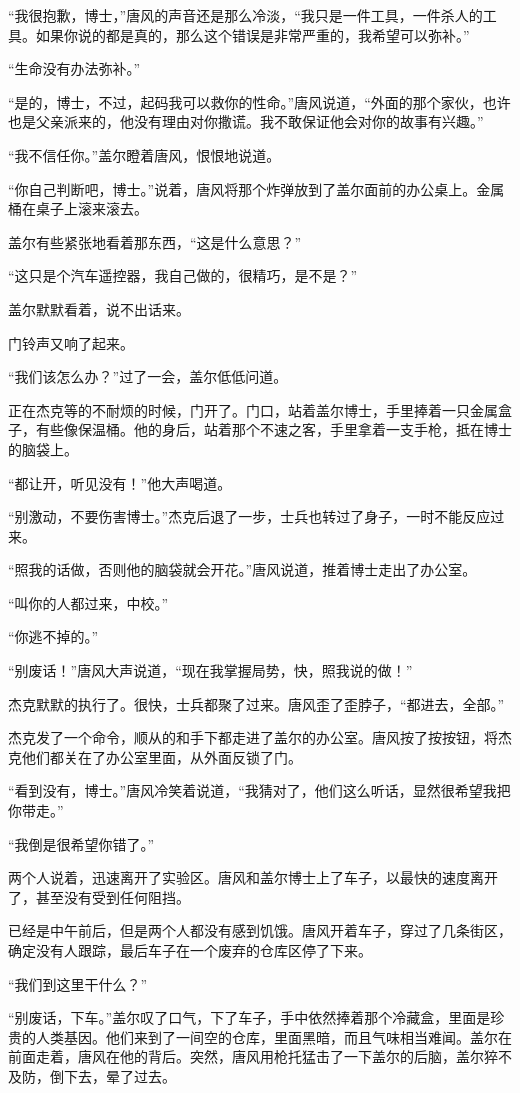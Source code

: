 “我很抱歉，博士，”唐风的声音还是那么冷淡，“我只是一件工具，一件杀人的工具。如果你说的都是真的，那么这个错误是非常严重的，我希望可以弥补。”

“生命没有办法弥补。”

“是的，博士，不过，起码我可以救你的性命。”唐风说道，“外面的那个家伙，也许也是父亲派来的，他没有理由对你撒谎。我不敢保证他会对你的故事有兴趣。”

“我不信任你。”盖尔瞪着唐风，恨恨地说道。

“你自己判断吧，博士。”说着，唐风将那个炸弹放到了盖尔面前的办公桌上。金属桶在桌子上滚来滚去。

盖尔有些紧张地看着那东西，“这是什么意思？”

“这只是个汽车遥控器，我自己做的，很精巧，是不是？”

盖尔默默看着，说不出话来。

门铃声又响了起来。

“我们该怎么办？”过了一会，盖尔低低问道。

正在杰克等的不耐烦的时候，门开了。门口，站着盖尔博士，手里捧着一只金属盒子，有些像保温桶。他的身后，站着那个不速之客，手里拿着一支手枪，抵在博士的脑袋上。

“都让开，听见没有！”他大声喝道。

“别激动，不要伤害博士。”杰克后退了一步，士兵也转过了身子，一时不能反应过来。

“照我的话做，否则他的脑袋就会开花。”唐风说道，推着博士走出了办公室。

“叫你的人都过来，中校。”

“你逃不掉的。”

“别废话！”唐风大声说道，“现在我掌握局势，快，照我说的做！”

杰克默默的执行了。很快，士兵都聚了过来。唐风歪了歪脖子，“都进去，全部。”

杰克发了一个命令，顺从的和手下都走进了盖尔的办公室。唐风按了按按钮，将杰克他们都关在了办公室里面，从外面反锁了门。

“看到没有，博士。”唐风冷笑着说道，“我猜对了，他们这么听话，显然很希望我把你带走。”

“我倒是很希望你错了。”

两个人说着，迅速离开了实验区。唐风和盖尔博士上了车子，以最快的速度离开了，甚至没有受到任何阻挡。

已经是中午前后，但是两个人都没有感到饥饿。唐风开着车子，穿过了几条街区，确定没有人跟踪，最后车子在一个废弃的仓库区停了下来。

“我们到这里干什么？”

“别废话，下车。”盖尔叹了口气，下了车子，手中依然捧着那个冷藏盒，里面是珍贵的人类基因。他们来到了一间空的仓库，里面黑暗，而且气味相当难闻。盖尔在前面走着，唐风在他的背后。突然，唐风用枪托猛击了一下盖尔的后脑，盖尔猝不及防，倒下去，晕了过去。

